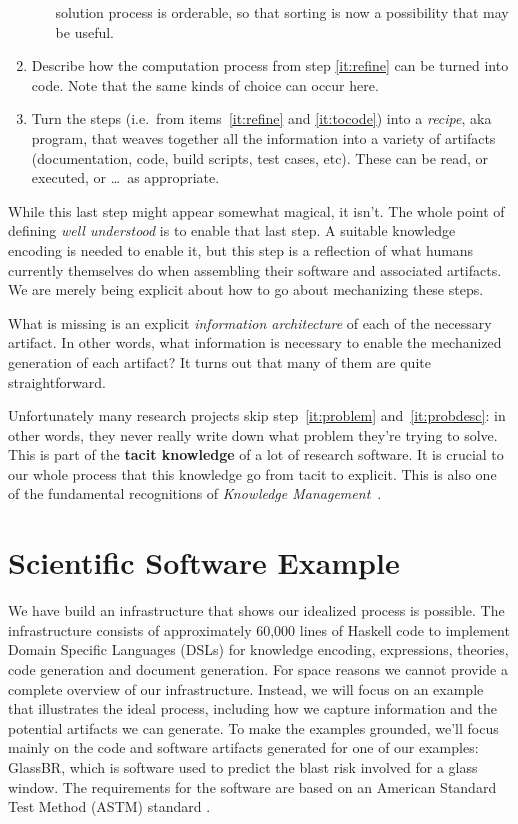 \documentclass[sigconf,review]{acmart}
\begin{document}
\begin{enumerate}
\begin{enumerate}
  solution process is orderable, so that sorting is now a possibility that
  may be useful.
  \end{enumerate}
\item\label{it:tocode} Describe how the computation process from step
\ref{it:refine} can be turned into code. Note that the same kinds of choice
can occur here.
\item\label{it:recipe} Turn the steps (i.e.\ from items~\ref{it:refine} and
\ref{it:tocode}) into a \emph{recipe}, aka program, that weaves together all the
information into a variety of artifacts (documentation, code, build scripts,
test cases, etc). These can be read, or executed, or \ldots\, as appropriate.
\end{enumerate}

While this last step might appear somewhat magical, it isn't. The whole point of
defining \emph{well understood} is to enable that last step. A suitable
knowledge encoding is needed to enable it, but this step is a reflection of what
humans currently themselves do when assembling their software and associated
artifacts. We are merely being explicit about how to go about mechanizing these
steps.

What is missing is an explicit \emph{information architecture} of each of
the necessary artifact. In other words, what information is necessary to
enable the mechanized generation of each artifact? It turns out that many
of them are quite straightforward.

Unfortunately many research projects skip step~\ref{it:problem}
and~\ref{it:probdesc}: in other words, they never really write down what problem
they're trying to solve. This is part of the \textbf{tacit knowledge} of a lot
of research software.  It is crucial to our whole process that this knowledge go
from tacit to explicit. This is also one of the fundamental recognitions of
\emph{Knowledge Management}~\cite{KM-textbook}.


\section{Scientific Software Example}\label{ch:example}

We have build an infrastructure that shows our idealized process is possible.
The infrastructure consists of approximately 60,000 lines of Haskell code to
implement Domain Specific Languages (DSLs) for knowledge encoding, expressions,
theories, code generation and document generation.  For space reasons we cannot
provide a complete overview of our infrastructure.
Instead, we will focus on an example that illustrates the ideal process,
including how we capture information and the potential artifacts we can
generate.  To make the examples grounded, we'll focus mainly on the code and
software artifacts generated for one of our examples: GlassBR, which is software
used to predict the blast risk involved for a glass window.  The requirements
for the software are based on an American Standard Test Method (ASTM) standard
\cite{BeasonEtAl1998}.
\end{document}
